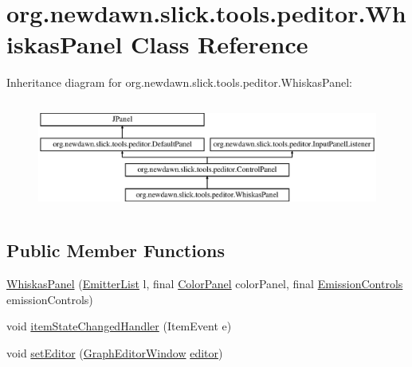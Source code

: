 \hypertarget{classorg_1_1newdawn_1_1slick_1_1tools_1_1peditor_1_1_whiskas_panel}{}\section{org.\+newdawn.\+slick.\+tools.\+peditor.\+Whiskas\+Panel Class Reference}
\label{classorg_1_1newdawn_1_1slick_1_1tools_1_1peditor_1_1_whiskas_panel}
Inheritance diagram for org.\+newdawn.\+slick.\+tools.\+peditor.\+Whiskas\+Panel\+:\begin{figure}[H]
\begin{center}
\leavevmode
\includegraphics[height=3.660131cm]{classorg_1_1newdawn_1_1slick_1_1tools_1_1peditor_1_1_whiskas_panel}
\end{center}
\end{figure}
\subsection*{Public Member Functions}
\begin{DoxyCompactItemize}
\item 
\mbox{\hyperlink{classorg_1_1newdawn_1_1slick_1_1tools_1_1peditor_1_1_whiskas_panel_a4cf87fd77fc80f3c26254fd53ebc94af}{Whiskas\+Panel}} (\mbox{\hyperlink{classorg_1_1newdawn_1_1slick_1_1tools_1_1peditor_1_1_emitter_list}{Emitter\+List}} l, final \mbox{\hyperlink{classorg_1_1newdawn_1_1slick_1_1tools_1_1peditor_1_1_color_panel}{Color\+Panel}} color\+Panel, final \mbox{\hyperlink{classorg_1_1newdawn_1_1slick_1_1tools_1_1peditor_1_1_emission_controls}{Emission\+Controls}} emission\+Controls)
\item 
void \mbox{\hyperlink{classorg_1_1newdawn_1_1slick_1_1tools_1_1peditor_1_1_whiskas_panel_a646bd746c6286192f6b1d3ba98f3e25b}{item\+State\+Changed\+Handler}} (Item\+Event e)
\item 
void \mbox{\hyperlink{classorg_1_1newdawn_1_1slick_1_1tools_1_1peditor_1_1_whiskas_panel_a4686898fc7dbd9aa6fd3ca5d3f850e50}{set\+Editor}} (\mbox{\hyperlink{classorg_1_1newdawn_1_1slick_1_1tools_1_1peditor_1_1_graph_editor_window}{Graph\+Editor\+Window}} \mbox{\hyperlink{classorg_1_1newdawn_1_1slick_1_1tools_1_1peditor_1_1_whiskas_panel_adafc0fc72d0d368d6298c3c44e4fa96c}{editor}})
\end{DoxyCompactItemize}

